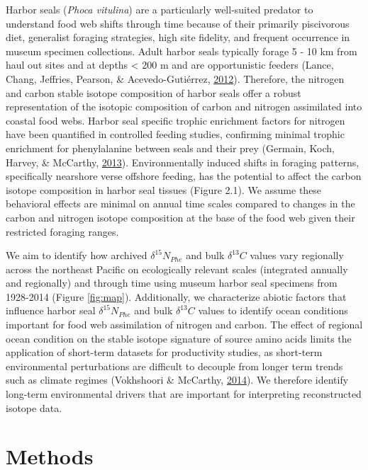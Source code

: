 \documentclass [11pt, proquest] {uwthesis}[2015/03/03]
\begin{document}
Harbor seals (\emph{Phoca vitulina}) are a particularly well-suited
predator to understand food web shifts through time because of their
primarily piscivorous diet, generalist foraging strategies, high site
fidelity, and frequent occurrence in museum specimen collections. Adult
harbor seals typically forage 5 - 10 km from haul out sites and at
depths \textless{} 200 m and are opportunistic feeders (Lance, Chang,
Jeffries, Pearson, \& Acevedo-Gutiérrez,
\protect\hyperlink{ref-Lance2012}{2012}). Therefore, the nitrogen and
carbon stable isotope composition of harbor seals offer a robust
representation of the isotopic composition of carbon and nitrogen
assimilated into coastal food webs. Harbor seal specific trophic
enrichment factors for nitrogen have been quantified in controlled
feeding studies, confirming minimal trophic enrichment for phenylalanine
between seals and their prey (Germain, Koch, Harvey, \& McCarthy,
\protect\hyperlink{ref-Germain2013}{2013}). Environmentally induced
shifts in foraging patterns, specifically nearshore verse offshore
feeding, has the potential to affect the carbon isotope composition in
harbor seal tissues (Figure 2.1). We assume these behavioral effects are
minimal on annual time scales compared to changes in the carbon and
nitrogen isotope composition at the base of the food web given their
restricted foraging ranges.

We aim to identify how archived \(\delta^{15}N_{Phe}\) and bulk
\(\delta^{13}C\) values vary regionally across the northeast Pacific on
ecologically relevant scales (integrated annually and regionally) and
through time using museum harbor seal specimens from 1928-2014 (Figure
\ref{fig:map}). Additionally, we characterize abiotic factors that
influence harbor seal \(\delta^{15}N_{Phe}\) and bulk \(\delta^{13}C\)
values to identify ocean conditions important for food web assimilation
of nitrogen and carbon. The effect of regional ocean condition on the
stable isotope signature of source amino acids limits the application of
short-term datasets for productivity studies, as short-term
environmental perturbations are difficult to decouple from longer term
trends such as climate regimes (Vokhshoori \& McCarthy,
\protect\hyperlink{ref-Vokshoori2014}{2014}). We therefore identify
long-term environmental drivers that are important for interpreting
reconstructed isotope data.

\section{Methods}\label{methods-1}
\end{document}
